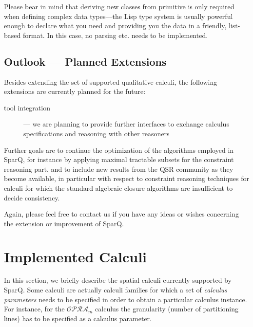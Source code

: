 \documentclass[headsepline]{scrreprt}
\theoremstyle{definition}
\newcommand{\engine}{SparQ}
\newcommand{\opra}{$\mathcal{OPRA}_m$}
\begin{document}
Please bear in mind that deriving new classes from primitive is only required when defining complex data types---the Lisp type system is usually powerful enough to declare what you need and providing you the data in a friendly, list-based format. In this case, no parsing etc. needs to be implemented.


\section{Outlook --- Planned Extensions}\label{sec:outlook}

Besides extending the set of supported qualitative calculi,
the following extensions are currently planned for the future:

\begin{description}
\item[tool integration] --- we are planning to provide further interfaces to
exchange calculus specifications and reasoning with other reasoners


\end{description}

Further goals are to continue the optimization of the algorithms employed
in \engine{}, for instance by applying maximal tractable subsets for
the constraint reasoning part, and to include new results from the
QSR community as they become available, in particular with respect to constraint reasoning
techniques for calculi for which the standard algebraic closure
algorithms are insufficient to decide consistency.

Again, please feel free to contact us if you have any ideas or wishes
concerning
the extension or improvement of \engine{}.




\appendix

\chapter{Implemented Calculi}\label{sec:supp-spat-calc}

In this section, we briefly describe the spatial calculi currently supported by \engine. Some calculi are actually calculi families for which a set of \emph{calculus parameters} needs to be specified in order to obtain a particular calculus instance. For instance, for the \opra{} calculus the granularity (number of partitioning lines) has to be specified as a calculus parameter.
\end{document}

